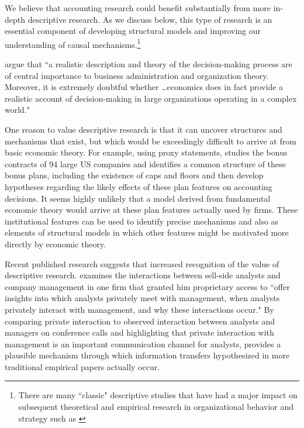 \documentclass[11pt,reqno,titlepage]{amsart}
\begin{document}
\begin{doublespace}
We believe that accounting research could benefit substantially from more in-depth descriptive research.
As we discuss below, this type of research is an essential component of developing structural models and improving our understanding of causal mechanisms.\footnote{
There are many ``classic" descriptive studies that have had a major impact on subsequent theoretical and empirical research in organizational behavior and strategy such as \citep{Cyert:1956fd,Bower:1986vd}}

\citet{Cyert:1956fd} argue that ``a realistic description and theory of the decision-making process are of central importance to business administration and organization theory. Moreover, it is extremely doubtful whether \dots economics does in fact provide a realistic account of decision-making in large organizations operating in a complex world."

One reason to value descriptive research is that it can uncover structures and mechanisms that exist, but which would be exceedingly difficult to arrive at from basic economic theory.
For example, using proxy statements, \citet{Healy:1985jg} studies the bonus contracts of 94 large US companies and identifies a common structure of these bonus plans, including the existence of caps and floors \citep[p.\,89]{Healy:1985jg} and then develop hypotheses regarding the likely effects of these plan features on accounting decisions.
It seems highly unlikely that a model derived from fundamental economic theory would arrive at these plan features actually used by firms.
These institutional features can be used to identify precise mechanisms and also as elements of structural models in which other features might be motivated more directly by economic theory.

Recent published research suggests that increased recognition of the value of descriptive research.
\citet{Soltes:2013ba} examines the interactions between sell-side analysts and company management in one firm that granted him proprietary access to ``offer insights into which analysts privately meet with management, when analysts privately interact with management, and why these interactions occur."  By comparing private interaction to observed interaction between analysts and managers on conference calls and highlighting that private interaction with management is an important communication channel for analysts, \citet{Soltes:2013ba} provides a plausible mechanism through which information transfers hypothesized in more traditional empirical papers actually occur.


\end{doublespace}
\end{document}
